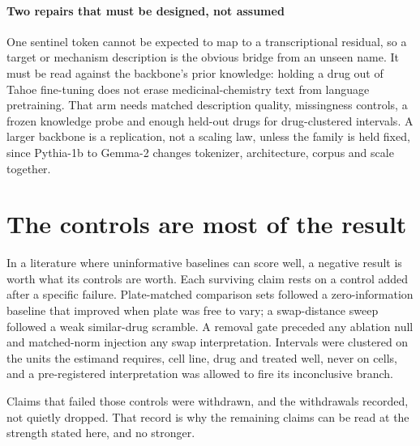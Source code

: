 \paragraph{Two repairs that must be designed, not assumed} One sentinel token
cannot be expected to map to a transcriptional residual, so a target or mechanism
description is the obvious bridge from an unseen name. It must be read against
the backbone's prior knowledge: holding a drug out of Tahoe fine-tuning does not
erase medicinal-chemistry text from language pretraining. That arm needs matched
description quality, missingness controls, a frozen knowledge probe and enough
held-out drugs for drug-clustered intervals. A larger backbone is a
replication, not a scaling law, unless the family is held fixed, since Pythia-1b
to Gemma-2 changes tokenizer, architecture, corpus and scale together.

\section{The controls are most of the result}

In a literature where uninformative baselines can score well, a negative result
is worth what its controls are worth. Each surviving claim rests on a control
added after a specific failure. Plate-matched comparison sets followed a
zero-information baseline that improved when plate was free to vary; a
swap-distance sweep followed a weak similar-drug scramble. A removal gate
preceded any ablation null and matched-norm injection any swap interpretation.
Intervals were
clustered on the units the estimand requires, cell line, drug and treated well,
never on cells, and a pre-registered interpretation was allowed to fire its
inconclusive branch.

Claims that failed those controls were withdrawn, and the withdrawals recorded,
not quietly dropped. That record is why the remaining claims can be read at the
strength stated here, and no stronger.

